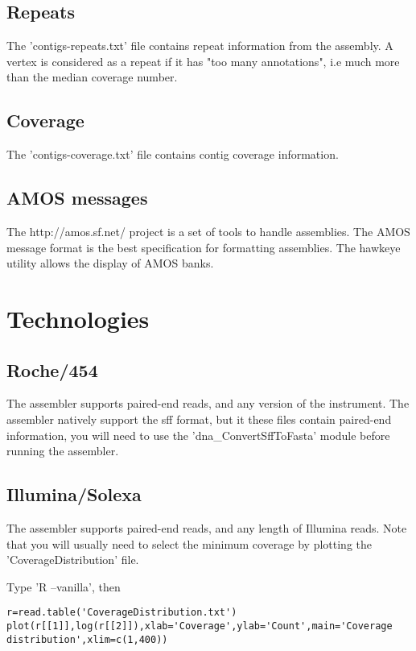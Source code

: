 \documentclass{article}
\begin{document}
\subsection{Repeats}

The 'contigs-repeats.txt' file contains repeat information from the assembly.
A vertex is considered as a repeat if it has "too many annotations", i.e much 
more than the median coverage number.

\subsection{Coverage}

The 'contigs-coverage.txt' file  contains contig coverage information.

\subsection{AMOS messages}

The http://amos.sf.net/ project is a set of tools to handle assemblies.
The AMOS message format is the best specification for formatting assemblies.
The hawkeye utility allows the display of AMOS banks.

\section{Technologies}
\subsection{Roche/454}

The assembler supports paired-end reads, and any version of the instrument.
The assembler natively support the sff format, but it these files contain
paired-end information, you will need to use the 'dna\_ConvertSffToFasta' module 
before running the assembler.

\subsection{Illumina/Solexa}

The assembler supports paired-end reads, and any length of Illumina reads.
Note that you will usually need to select the minimum coverage by plotting
the 'CoverageDistribution' file.

Type 'R --vanilla', then
\begin{verbatim}
r=read.table('CoverageDistribution.txt')
plot(r[[1]],log(r[[2]]),xlab='Coverage',ylab='Count',main='Coverage distribution',xlim=c(1,400))
\end{verbatim}
\end{document}
